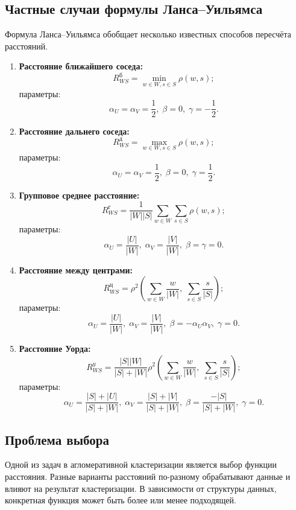 \subsection{Частные случаи формулы Ланса–Уильямса}
Формула Ланса–Уильямса обобщает несколько известных способов пересчёта расстояний.

\begin{enumerate}
    \item \textbf{Расстояние ближайшего соседа:}
    \[
    R^{б}_{WS} = \min_{w \in W, s \in S} \rho(w, s);
    \]
    параметры:
    \[
    \alpha_U = \alpha_V = \frac{1}{2}, \; \beta = 0, \; \gamma = -\frac{1}{2}.
    \]

    \item \textbf{Расстояние дальнего соседа:}
    \[
    R^{д}_{WS} = \max_{w \in W, s \in S} \rho(w, s);
    \]
    параметры:
    \[
    \alpha_U = \alpha_V = \frac{1}{2}, \; \beta = 0, \; \gamma = \frac{1}{2}.
    \]

    \item \textbf{Групповое среднее расстояние:}
    \[
    R^{г}_{WS} = \frac{1}{|W||S|} \sum_{w \in W} \sum_{s \in S} \rho(w, s);
    \]
    параметры:
    \[
    \alpha_U = \frac{|U|}{|W|}, \; \alpha_V = \frac{|V|}{|W|}, \; \beta = \gamma = 0.
    \]

    \item \textbf{Расстояние между центрами:}
    \[
    R^{ц}_{WS} = \rho^2 \left( \sum_{w \in W} \frac{w}{|W|}, \; \sum_{s \in S} \frac{s}{|S|} \right);
    \]
    параметры:
    \[
    \alpha_U = \frac{|U|}{|W|}, \; \alpha_V = \frac{|V|}{|W|}, \; \beta = -\alpha_U \alpha_V, \; \gamma = 0.
    \]

    \item \textbf{Расстояние Уорда:}
    \[
    R^{y}_{WS} = \frac{|S||W|}{|S| + |W|} \rho^2 \left( \sum_{w \in W} \frac{w}{|W|}, \; \sum_{s \in S} \frac{s}{|S|} \right);
    \]
    параметры:
    \[
    \alpha_U = \frac{|S| + |U|}{|S| + |W|}, \; \alpha_V = \frac{|S| + |V|}{|S| + |W|}, \; \beta = \frac{-|S|}{|S| + |W|}, \; \gamma = 0.
    \]
\end{enumerate}

\subsection{Проблема выбора}
Одной из задач в агломеративной кластеризации является выбор функции расстояния. Разные варианты расстояний по-разному обрабатывают данные и влияют на результат кластеризации. В зависимости от структуры данных, конкретная функция может быть более или менее подходящей.

